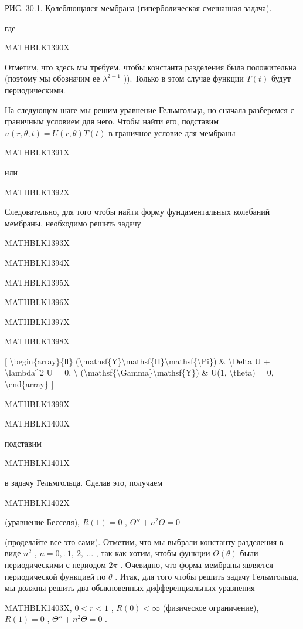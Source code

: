 \documentclass[
]{article}
\begin{document}
{{{РИС. 30.1. Қолеблющаяся мембрана (гиперболическая смешанная задача).

где

MATHBLK1390X

Отметим, что здесь мы требуем, чтобы константа разделения была
положительна (поэтому мы обозначим ее \(\lambda^{2-1}\) )). Только в
этом случае функции \(T(t)\) будут периодическими.

На следующем шаге мы решим уравнение Гельмгольца, но сначала разберемся
с граничным условием для него. Чтобы найти его, подставим
\(u(r, \theta, t) = U(r, \theta) T(t)\) в граничное условие для мембраны

MATHBLK1391X

или

MATHBLK1392X

Следовательно, для того чтобы найти форму фундаментальных колебаний
мембраны, необходимо решить задачу

MATHBLK1393X

MATHBLK1394X

MATHBLK1395X

MATHBLK1396X

MATHBLK1397X

MATHBLK1398X

{[} \textbackslash begin\{array\}\{ll\}
(\textbackslash mathsf\{Y\}\textbackslash mathsf\{H\}\textbackslash mathsf\{\textbackslash Pi\})
\& \textbackslash Delta U + \textbackslash lambda\^{}2 U = 0,
\textbackslash{}
(\textbackslash mathsf\{\textbackslash Gamma\}\textbackslash mathsf\{Y\})
\& U(1, \textbackslash theta) = 0, \textbackslash end\{array\} {]}

MATHBLK1399X

MATHBLK1400X

подставим

MATHBLK1401X

в задачу Гельмгольца. Сделав это, получаем

MATHBLK1402X

(уравнение Бесселя), \(R(1) = 0\) , \(\Theta'' + n^2\Theta = 0\)

(проделайте все это сами). Отметим, что мы выбрали константу разделения
в виде \(n^2\) , \(n=0,. \ 1,\ 2,\ \ldots\) , так как хотим, чтобы
функции \(\Theta\left(\theta\right)\) были периодическими с периодом
\(2\pi\) . Очевидно, что форма мембраны является периодической функцией
по \(\theta\) . Итак, для того чтобы решить задачу Гельмгольца, мы
должны решить два обыкновенных дифференциальных уравнения

MATHBLK1403X, \(0 < r < 1\) , \(R(0) < \infty\) (физическое
ограничение), \(R(1) = 0\) , \(\Theta'' + n^2\Theta = 0\) .

}}}
\end{document}
